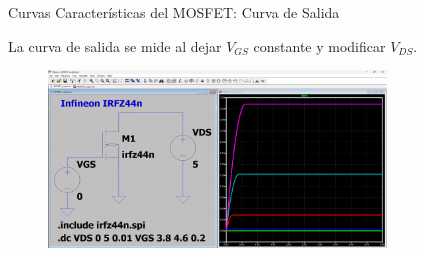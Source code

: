 \documentclass[t,aspectratio=169,10pt]{beamer}
\begin{document}
\begin{frame}{Curvas Características del MOSFET: Curva de Salida}

La curva de salida se mide al dejar $V_{GS}$ constante y modificar $V_{DS}$.

\begin{figure}
    \centering
    \includegraphics[width=0.8\textwidth]{figuras/mosfet_output.png}
\end{figure}\textbf{}

\end{frame}
\end{document}

